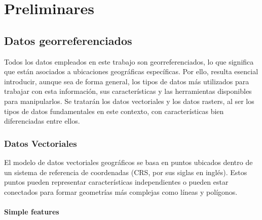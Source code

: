 \documentclass[12pt,a4paper,]{book}
\def\ifdoblecara{} %
\def\ifprincipal{} %
\numberwithin{dummy}{section}
\theoremstyle{ocrenumbox}
\theoremstyle{blacknumex}
\theoremstyle{blacknumbox}
\theoremstyle{ocrenum}
\theoremstyle{ocrenum}
\begin{document}
\ifdefined\ifprincipal
\else
\setlength{\parindent}{1em}
\pagestyle{fancy}
\setcounter{tocdepth}{4}
\tableofcontents

\fi

\ifdefined\ifdoblecara
\fancyhead{}{}
\fancyhead[LE,RO]{\scriptsize\rightmark}
\fancyfoot[LO,RE]{\scriptsize\slshape \leftmark}
\fancyfoot[C]{}
\fancyfoot[LE,RO]{\footnotesize\thepage}
\else
\fancyhead{}{}
\fancyhead[RO]{\scriptsize\rightmark}
\fancyfoot[LO]{\scriptsize\slshape \leftmark}
\fancyfoot[C]{}
\fancyfoot[RO]{\footnotesize\thepage}
\fi

\renewcommand{\headrulewidth}{0.4pt}
\renewcommand{\footrulewidth}{0.4pt}

\hypertarget{preliminares}{%
\chapter{Preliminares}\label{preliminares}}

\hypertarget{datos-georreferenciados}{%
\section{Datos georreferenciados}\label{datos-georreferenciados}}

Todos los datos empleados en este trabajo son georreferenciados, lo que
significa que están asociados a ubicaciones geográficas específicas. Por
ello, resulta esencial introducir, aunque sea de forma general, los
tipos de datos más utilizados para trabajar con esta información, sus
características y las herramientas disponibles para manipularlos. Se
tratarán los datos vectoriales y los datos rasters, al ser los tipos de
datos fundamentales en este contexto, con características bien
diferenciadas entre ellos.

\hypertarget{datos-vectoriales}{%
\subsection{Datos Vectoriales}\label{datos-vectoriales}}

El modelo de datos vectoriales geográficos se basa en puntos ubicados
dentro de un sistema de referencia de coordenadas (CRS, por sus siglas
en inglés). Estos puntos pueden representar características
independientes o pueden estar conectados para formar geometrías más
complejas como líneas y polígonos.

\hypertarget{simple-features}{%
\subsubsection{Simple features}\label{simple-features}}
\end{document}
